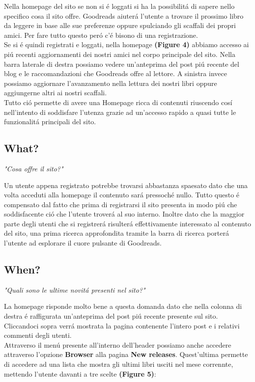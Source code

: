 \documentclass[12pt]{article}
\begin{document}
Nella homepage del sito se non si \'e loggati si ha la possibilit\'a di sapere nello specifico cosa il sito offre. Goodreads aiuter\'a l'utente a trovare il prossimo libro da leggere in base alle sue preferenze oppure spulciando gli scaffali dei propri amici. Per fare tutto questo per\'o c'\'e bisono di una registrazione.\\
Se si \'e quindi registrati e loggati, nella homepage \textbf{(Figure 4)} abbiamo accesso ai pi\'u recenti aggiornamenti dei nostri amici nel corpo principale del sito. Nella barra laterale di destra possiamo vedere un'anteprima del post pi\'u recente del blog e le raccomandazioni che Goodreads offre al lettore. A sinistra invece possiamo aggiornare l'avanzamento nella lettura dei nostri libri oppure aggiungerne altri ai nostri scaffali.\\

\noindent Tutto ci\'o permette di avere una Homepage ricca di contenuti riuscendo cos\'i nell'intento di soddisfare l'utenza grazie ad un'accesso rapido a quasi tutte le funzionalit\'a principali del sito.


\subsection{What?}
\begin{center}
{\large \textit{"Cosa offre il sito?"}}
\end{center}

\noindent Un utente appena registrato potrebbe trovarsi abbastanza spaesato dato che una volta acceduti alla homepage il contenuto sar\'a pressoch\'e nullo. Tutto questo \'e compensato dal fatto che prima di registrarsi il sito presenta in modo pi\'u che soddisfacente ci\'o che l'utente trover\'a al suo interno. Inoltre dato che la maggior parte degli utenti che si registrer\'a risulter\'a effettivamente interessato al contenuto del sito, una prima ricerca approfondita tramite la barra di ricerca porter\'a l'utente ad esplorare il cuore pulsante di Goodreads.


\subsection{When?}
\begin{center}
{\large \textit{"Quali sono le ultime novit\'a presenti nel sito?"}}
\end{center}
La homepage risponde molto bene a questa domanda dato che nella colonna di destra \'e raffigurata un'anteprima del post pi\'u recente presente sul sito. Cliccandoci sopra verr\'a mostrata la pagina contenente l'intero post e i relativi commenti degli utenti.\\
Attraverso il men\'u presente all'interno dell'header possiamo anche accedere attraverso l'opzione \textbf{Browser} alla pagina \textbf{New releases}. Quest'ultima permette di accedere ad una lista che mostra gli ultimi libri usciti nel mese corrennte, mettendo l'utente davanti a tre scelte \textbf{(Figure 5)}:
\end{document}

